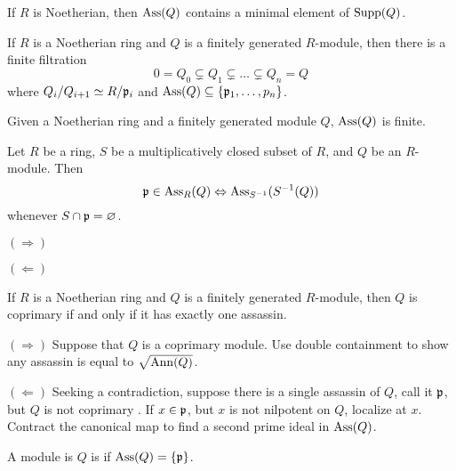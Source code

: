 \documentclass{ximera}
\begin{document}
\begin{proposition}
  If $R$ is Noetherian, then $\operatorname{Ass}(Q)$ contains a minimal element of
  $\operatorname{Supp}(Q)$.
\end{proposition}


\begin{proposition}
  If $R$ is a Noetherian ring and $Q$ is a finitely generated
  $R$-module, then there is a finite filtration
  \[
  0 = Q_0 \subsetneq Q_1 \subsetneq \dots \subsetneq Q_n = Q 
  \]
  where $Q_i/Q_{i+1} \simeq R/\mathfrak{p}_i$ and $\operatorname{Ass}(Q) \subseteq
  \{\mathfrak{p}_1,\dots,p_n\}$.
\end{proposition}

\begin{corollary}
  Given a Noetherian ring and a finitely generated module $Q$,
  $\operatorname{Ass}(Q)$ is finite.
\end{corollary}





\begin{proposition}
  Let $R$ be a ring, $S$ be a multiplicatively closed subset of $R$,
  and $Q$ be an $R$-module. Then
  \[
  \mathfrak{p} \in \operatorname{Ass}_R(Q) \Leftrightarrow \operatorname{Ass}_{S^{-1}}(S^{-1}(Q))
  \]
  whenever $S\cap\mathfrak{p} = \varnothing$.
  \begin{sketch}
    $(\Rightarrow)$

    $(\Leftarrow)$
  \end{sketch}
\end{proposition}


\begin{lemma}
  If $R$ is a Noetherian ring and $Q$ is a finitely generated
  $R$-module, then $Q$ is coprimary if and only if it has exactly one
  assassin.
  \begin{sketch} 
    $(\Rightarrow)$ Suppose that $Q$ is a coprimary module. Use double
    containment to show any assassin is equal to $\sqrt{\operatorname{Ann}(Q)}$.

    
    $(\Leftarrow)$ Seeking a contradiction, suppose there is a single
    assassin of $Q$, call it $\mathfrak{p}$, but $Q$ is not coprimary . If $x\in
    \mathfrak{p}$, but $x$ is not nilpotent on $Q$, localize at $x$. Contract
    the canonical map to find a second prime ideal in $\operatorname{Ass}(Q)$.
  \end{sketch}
\end{lemma}


\begin{definition}
  A module is $Q$ is  if $\operatorname{Ass}(Q) = \{\mathfrak{p}\}$.
\end{definition}
\end{document}
